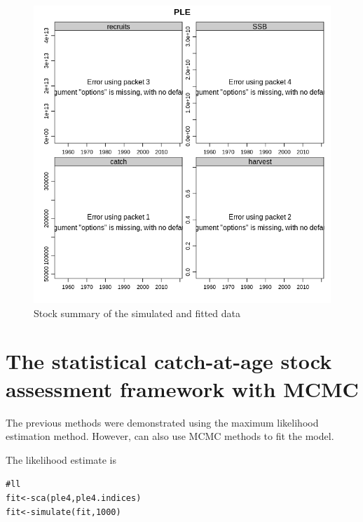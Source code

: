 \documentclass[a4paper,english,10pt]{article}\usepackage[]{graphicx}\usepackage[]{color}
\makeatletter
\newcommand{\hlnum}[1]{\textcolor[rgb]{0.063,0.58,0.627}{#1}}%
\newcommand{\hlcom}[1]{\textcolor[rgb]{0.588,0.588,0.588}{#1}}%
\newcommand{\hlstd}[1]{\textcolor[rgb]{0.196,0.196,0.196}{#1}}%
\newcommand{\hlkwb}[1]{\textcolor[rgb]{0.627,0,0.314}{#1}}%
\newcommand{\hlkwd}[1]{\textcolor[rgb]{0.78,0.227,0.412}{#1}}%
\newenvironment{kframe}{%
 \def\at@end@of@kframe{}%
 \ifinner\ifhmode%
  \def\at@end@of@kframe{\end{minipage}}%
  \begin{minipage}{\columnwidth}%
 \fi\fi%
 \def\FrameCommand##1{\hskip\@totalleftmargin \hskip-\fboxsep
 \colorbox{shadecolor}{##1}\hskip-\fboxsep
     \hskip-\linewidth \hskip-\@totalleftmargin \hskip\columnwidth}%
 \MakeFramed {\advance\hsize-\width
   \@totalleftmargin\z@ \linewidth\hsize
   \@setminipage}}%
 {\par\unskip\endMakeFramed%
 \at@end@of@kframe}
\newenvironment{knitrout}{}{} %
\makeatother
\begin{document}
\begin{knitrout}
\color{fgcolor}\begin{figure}[H]

{\centering \includegraphics[width=.9\linewidth]{figure/sim2-1} 

}

\caption[Stock summary of the simulated and fitted data]{Stock summary of the simulated and fitted data}\label{fig:sim2}
\end{figure}


\end{knitrout}

\section{The statistical catch-at-age stock assessment framework with MCMC}

The previous methods were demonstrated using the maximum likelihood estimation method. However,  can also use MCMC methods to fit the model. 

The likelihood estimate is

\begin{knitrout}
\color{fgcolor}\begin{kframe}
\begin{alltt}
\hlcom{# ll}
\hlstd{fit} \hlkwb{<-} \hlkwd{sca}\hlstd{(ple4, ple4.indices)}
\hlstd{fit} \hlkwb{<-} \hlkwd{simulate}\hlstd{(fit,} \hlnum{1000}\hlstd{)}
\end{alltt}
\end{kframe}
\end{knitrout}
\end{document}
